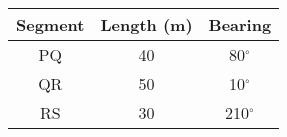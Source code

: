         \begin{tabular}{|c|c|c|}
            \hline
            Segment & Length (m) & Bearing \\
            \hline
            PQ & 40 & 80$^\circ$ \\
            QR & 50 & 10$^\circ$ \\
            RS & 30 & 210$^\circ$ \\
          
            \hline
        \end{tabular}
